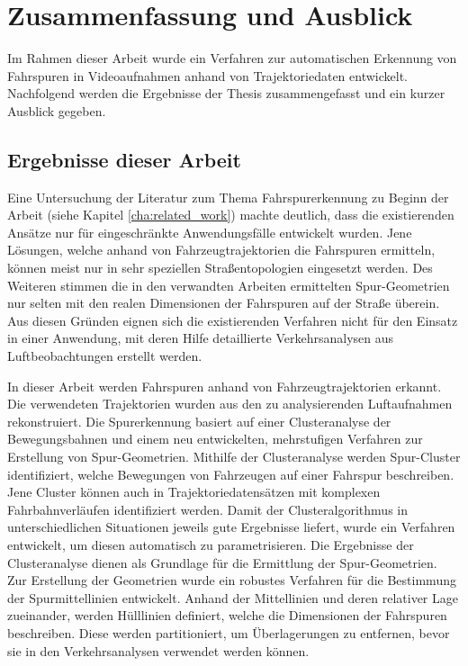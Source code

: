 
\chapter{Zusammenfassung und Ausblick}
\label{cha:end}

Im Rahmen dieser Arbeit wurde ein Verfahren zur automatischen Erkennung von Fahrspuren in Videoaufnahmen
anhand von Trajektoriedaten entwickelt.
Nachfolgend werden die Ergebnisse der Thesis zusammengefasst und ein kurzer Ausblick gegeben.

\section{Ergebnisse dieser Arbeit}

Eine Untersuchung der Literatur zum Thema Fahrspurerkennung zu Beginn der Arbeit
(siehe Kapitel \ref{cha:related_work}) machte deutlich, dass die existierenden Ansätze 
nur für eingeschränkte Anwendungsfälle entwickelt wurden. 
Jene Lösungen, welche anhand von Fahrzeugtrajektorien die Fahrspuren ermitteln, können meist nur
in sehr speziellen Straßentopologien eingesetzt werden.
Des Weiteren stimmen die in den verwandten Arbeiten ermittelten Spur-Geometrien nur selten mit den
realen Dimensionen der Fahrspuren auf der Straße überein.
Aus diesen Gründen eignen sich die existierenden Verfahren nicht für den Einsatz in einer
Anwendung, mit deren Hilfe detaillierte Verkehrsanalysen aus Luftbeobachtungen erstellt werden.

In dieser Arbeit werden Fahrspuren anhand von Fahrzeugtrajektorien erkannt. Die verwendeten Trajektorien
wurden aus den zu analysierenden Luftaufnahmen rekonstruiert.
Die Spurerkennung basiert auf einer Clusteranalyse der Bewegungsbahnen
und einem neu entwickelten, mehrstufigen Verfahren zur Erstellung von Spur-Geometrien.
Mithilfe der Clusteranalyse werden Spur-Cluster identifiziert, welche Bewegungen von Fahrzeugen auf einer Fahrspur beschreiben.
Jene Cluster können auch in Trajektoriedatensätzen mit komplexen Fahrbahnverläufen identifiziert werden.
Damit der Clusteralgorithmus in unterschiedlichen Situationen jeweils gute Ergebnisse liefert, wurde ein Verfahren
entwickelt, um diesen automatisch zu parametrisieren.
Die Ergebnisse der Clusteranalyse dienen als Grundlage für die Ermittlung der Spur-Geometrien.
Zur Erstellung der Geometrien wurde ein robustes Verfahren für die Bestimmung der Spurmittellinien entwickelt.
Anhand der Mittellinien und deren relativer Lage zueinander, werden Hülllinien definiert,
welche die Dimensionen der Fahrspuren beschreiben. Diese werden partitioniert,
um Überlagerungen zu entfernen, bevor sie in den Verkehrsanalysen verwendet werden können.


